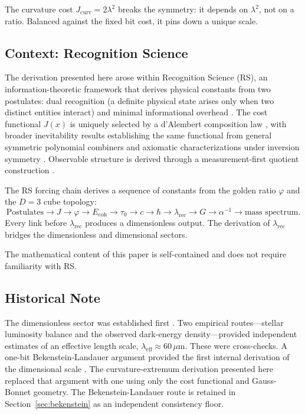 \documentclass[12pt]{article}
\theoremstyle{definition}
\theoremstyle{remark}
\begin{document}
The curvature cost $J_{\mathrm{curv}} = 2\lambda^2$ breaks the
symmetry: it depends on $\lambda^2$, not on a ratio. Balanced
against the fixed bit cost, it pins down a unique scale.

\subsection{Context: Recognition Science}

The derivation presented here arose within Recognition Science (RS),
an information-theoretic framework that derives physical constants
from two postulates: dual recognition (a definite physical state
arises only when two distinct entities interact) and minimal
informational overhead \cite{PardoGuerraEtAl2026}. The cost
functional $J(x)$ is uniquely selected by a d'Alembert composition
law \cite{WashburnZlatanovic2026Math935}, with broader inevitability
results establishing the same functional from general symmetric
polynomial combiners
\cite{WashburnZlatanovicAllahyarov2026Inevitability} and axiomatic
characterizations under inversion symmetry
\cite{WashburnBarghi2026Axioms151}. Observable structure is derived
through a measurement-first quotient construction
\cite{WashburnZlatanovicAllahyarov2026RG}.

The RS forcing chain derives a sequence of constants from the golden
ratio $\varphi$ and the $D = 3$ cube topology:
\begin{equation}
  \text{Postulates} \to J \to \varphi \to
  E_{\mathrm{coh}} \to \tau_0 \to c \to \hbar
  \to \lambda_{\mathrm{rec}} \to G \to \alpha^{-1}
  \to \text{mass spectrum}.
  \label{eq:chain}
\end{equation}
Every link before $\lambda_{\mathrm{rec}}$ produces a dimensionless
output. The derivation of $\lambda_{\mathrm{rec}}$ bridges the
dimensionless and dimensional sectors.

The mathematical content of this paper is self-contained and does
not require familiarity with RS.

\subsection{Historical Note}

The dimensionless sector was established first
\cite{Washburn2025ParameterFree}. Two empirical routes---stellar
luminosity balance and the observed dark-energy density---provided
independent estimates of an effective length scale,
$\lambda_{\mathrm{eff}} \approx 60\,\mu\mathrm{m}$. These were cross-checks. A one-bit Bekenstein-Landauer argument
provided the first internal derivation of the dimensional scale
\cite{Washburn2025IntrinsicLattice}. The curvature-extremum
derivation presented here replaced that argument with one using
only the cost functional and Gauss-Bonnet geometry. The
Bekenstein-Landauer route is retained in
Section~\ref{sec:bekenstein} as an independent consistency floor.
\end{document}
